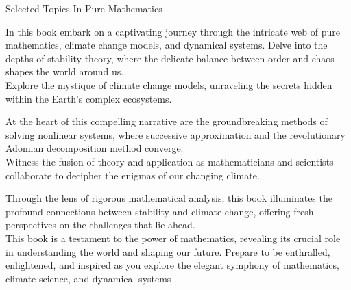 \begingroup
\newpage
{}
\thispagestyle{empty}
\color{cover}
\begin{center}
    {
        \fontsize{20pt}{0}\handfont \color{white}
        Selected Topics In Pure Mathematics
    }
\end{center}

\vspace*{.5cm}
{\fontsize{15pt}{0} \Garamondfont \selectfont
    In this book embark on a captivating journey through the intricate web of pure mathematics, climate change models, and dynamical systems. Delve into the depths of stability theory, where the delicate balance between order and chaos shapes the world around us.
    \\Explore the mystique of climate change models, unraveling the secrets hidden within the Earth's complex ecosystems.
    \par
    \vspace*{1cm}
    At the heart of this compelling narrative are the groundbreaking methods of solving nonlinear systems, where successive approximation and the revolutionary Adomian decomposition method converge.
    \\Witness the fusion of theory and application as mathematicians and scientists collaborate to decipher the enigmas of our changing climate.
    \par
    \vspace*{1cm}
    Through the lens of rigorous mathematical analysis,
    this book illuminates the profound connections between stability and climate change, offering fresh perspectives on the challenges that lie ahead.
    \\This book is a testament to the power of mathematics, revealing its crucial role in understanding the world and shaping our future. Prepare to be enthralled, enlightened, and inspired as you explore the elegant symphony of mathematics, climate science, and dynamical systems
}

